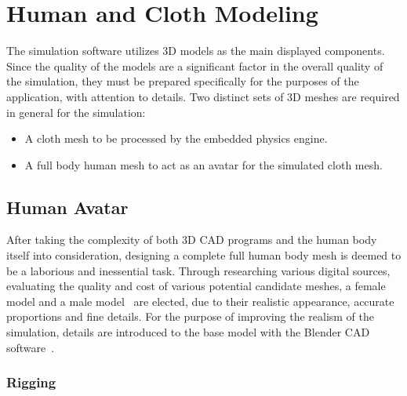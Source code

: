 \chapter{Human and Cloth Modeling}
\label{chapter_3d_model}

The simulation software utilizes 3D models as the main displayed components. Since the quality of the models are a significant factor in the overall quality of the simulation, they must be prepared specifically for the purposes of the application, with attention to details. Two distinct sets of 3D meshes are required in general for the simulation: 

\begin{itemize}
\item A cloth mesh to be processed by the embedded physics engine.
\item A full body human mesh to act as an avatar for the simulated cloth mesh.
\end{itemize}

\section{Human Avatar}
\label{section_human_avatar}


After taking the complexity of both 3D CAD programs and the human body itself into consideration, designing a complete full human body mesh is deemed to be a laborious and inessential task. Through researching various digital sources, evaluating the quality and cost of various potential candidate meshes, a female~\cite{Mmava2012} model and a male model~\cite{Gomer2013} are elected, due to their realistic appearance, accurate proportions and fine details. For the purpose of improving the realism of the simulation, details are introduced to the base model with the Blender CAD software~\cite{Blender}.  

\subsection{Rigging}

